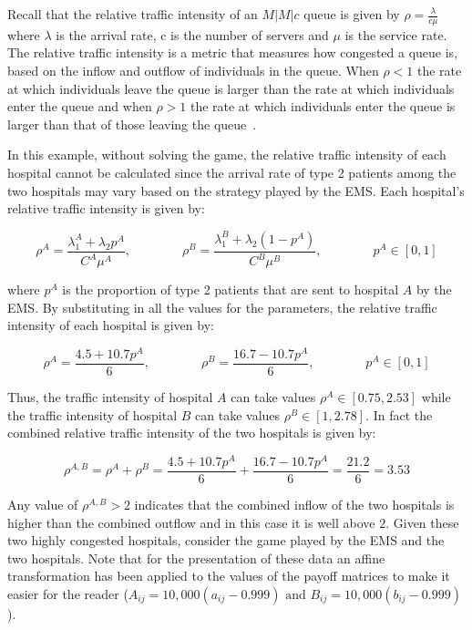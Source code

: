 Recall that the relative traffic intensity of an \(M|M|c\) queue is given by
\(\rho = \frac{\lambda}{c \mu}\) where \(\lambda\) is the arrival rate, c is
the number of servers and \(\mu\) is the service rate.
The relative traffic intensity is a metric that measures how congested a queue
is, based on the inflow and outflow of individuals in the queue.
When \(\rho < 1\) the rate at which individuals leave the queue is larger than
the rate at which individuals enter
the queue and when \(\rho > 1\) the rate at which individuals enter the queue is
larger than that of those leaving the queue~\cite{almeida2018note}.

In this example, without solving the game, the relative traffic intensity of
each hospital cannot be calculated since the arrival rate of type 2 patients
among the two hospitals may vary based on the strategy played by the EMS.
Each hospital's relative traffic intensity is given by:

\begin{equation}
    \rho^A = \frac{\lambda_1^A + \lambda_2 p^A}{C^A \mu^A}, \qquad \qquad
    \rho^B = \frac{\lambda_1^B + \lambda_2 (1 - p^A)}{C^B \mu^B}, \qquad \qquad
    p^A \in [0, 1]
\end{equation}

where \(p^A\) is the proportion of type 2 patients that are sent to hospital
\(A\) by the EMS.
By substituting in all the values for the parameters, the relative traffic
intensity of each hospital is given by:

\begin{equation}
    \rho^A = \frac{4.5 + 10.7 p^A}{6}, \qquad \qquad
    \rho^B = \frac{16.7 - 10.7 p^A}{6}, \qquad \qquad
    p^A \in [0, 1]
\end{equation}

Thus, the traffic intensity of hospital \(A\) can take values \(\rho^A \in
[0.75, 2.53]\) while the traffic intensity of hospital \(B\) can take values
\(\rho^B \in [1, 2.78]\).
In fact the combined relative traffic intensity of the two hospitals is given
by:

\begin{equation}
    \rho^{A, B} = \rho^A + \rho^B = \frac{4.5 + 10.7 p^A}{6} +
    \frac{16.7 - 10.7 p^A}{6} = \frac{21.2}{6} = 3.53
\end{equation}

Any value of \(\rho^{A, B} > 2\) indicates that the combined inflow of the
two hospitals is higher than the combined outflow and in this case it is well
above \(2\).
Given these two highly congested hospitals, consider the game played by the
EMS and the two hospitals.
Note that for the presentation of these data an affine transformation has been
applied to the values of the payoff matrices to make it easier for the reader
(\(A_{ij} = 10,\!000 (a_{ij} - 0.999) \text{ and }
B_{ij} = 10,\!000 (b_{ij} - 0.999)\)).

